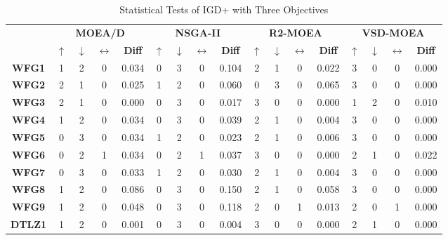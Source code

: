 \begin{table*}[t]
\caption{Statistical Tests of IGD+ with Three Objectives}
\label{tab:Tests_IGDP_3obj}
\centering
\begin{tabular}{c|c|c|c|c|c|c|c|c|c|c|c|c|c|c|c|c|}
\cline{2-17}
\textbf{} & \multicolumn{4}{c|}{\textbf{MOEA/D}} & \multicolumn{4}{c|}{\textbf{NSGA-II}} & \multicolumn{4}{c|}{\textbf{R2-MOEA}} & \multicolumn{4}{c|}{\textbf{VSD-MOEA}} \\ \cline{2-17} 
 & \textbf{$\uparrow$} & \textbf{$\downarrow$} & \textbf{$\leftrightarrow$} & \textbf{Diff} & \textbf{$\uparrow$} & \textbf{$\downarrow$} & \textbf{$\leftrightarrow$} & \textbf{Diff} & \textbf{$\uparrow$} & \textbf{$\downarrow$} & \textbf{$\leftrightarrow$} & \textbf{Diff} & \textbf{$\uparrow$} & \textbf{$\downarrow$} & \textbf{$\leftrightarrow$} & \textbf{Diff} \\ \hline
\multicolumn{1}{|c|}{\textbf{WFG1}} & 1 & 2 & 0 & 0.034 & 0 & 3 & 0 & 0.104 & 2 & 1 & 0 & 0.022 & 3 & 0 & 0 & 0.000 \\ \hline
\multicolumn{1}{|c|}{\textbf{WFG2}} & 2 & 1 & 0 & 0.025 & 1 & 2 & 0 & 0.060 & 0 & 3 & 0 & 0.065 & 3 & 0 & 0 & 0.000 \\ \hline
\multicolumn{1}{|c|}{\textbf{WFG3}} & 2 & 1 & 0 & 0.000 & 0 & 3 & 0 & 0.017 & 3 & 0 & 0 & 0.000 & 1 & 2 & 0 & 0.010 \\ \hline
\multicolumn{1}{|c|}{\textbf{WFG4}} & 1 & 2 & 0 & 0.034 & 0 & 3 & 0 & 0.039 & 2 & 1 & 0 & 0.004 & 3 & 0 & 0 & 0.000 \\ \hline
\multicolumn{1}{|c|}{\textbf{WFG5}} & 0 & 3 & 0 & 0.034 & 1 & 2 & 0 & 0.023 & 2 & 1 & 0 & 0.006 & 3 & 0 & 0 & 0.000 \\ \hline
\multicolumn{1}{|c|}{\textbf{WFG6}} & 0 & 2 & 1 & 0.034 & 0 & 2 & 1 & 0.037 & 3 & 0 & 0 & 0.000 & 2 & 1 & 0 & 0.022 \\ \hline
\multicolumn{1}{|c|}{\textbf{WFG7}} & 0 & 3 & 0 & 0.033 & 1 & 2 & 0 & 0.030 & 2 & 1 & 0 & 0.004 & 3 & 0 & 0 & 0.000 \\ \hline
\multicolumn{1}{|c|}{\textbf{WFG8}} & 1 & 2 & 0 & 0.086 & 0 & 3 & 0 & 0.150 & 2 & 1 & 0 & 0.058 & 3 & 0 & 0 & 0.000 \\ \hline
\multicolumn{1}{|c|}{\textbf{WFG9}} & 1 & 2 & 0 & 0.048 & 0 & 3 & 0 & 0.118 & 2 & 0 & 1 & 0.013 & 2 & 0 & 1 & 0.000 \\ \hline
\multicolumn{1}{|c|}{\textbf{DTLZ1}} & 1 & 2 & 0 & 0.001 & 0 & 3 & 0 & 0.004 & 3 & 0 & 0 & 0.000 & 2 & 1 & 0 & 0.000 \\ \hline

\end{tabular}
\end{table*}
